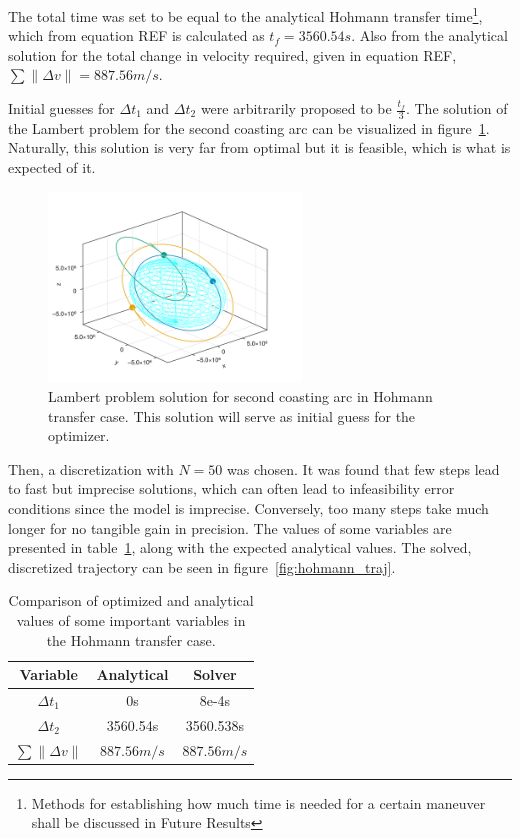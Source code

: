 The total time was set to be equal to the analytical Hohmann transfer time\footnote{Methods for establishing how much time is needed for a certain maneuver shall be discussed in Future Results}, which from equation REF is calculated as \(t_f = 3560.54s\). Also from the analytical solution for the total change in velocity required, given in equation REF, \(\sum \lVert \Delta v \rVert = 887.56m/s\).

Initial guesses for \(\Delta t_1\) and \(\Delta t_2\) were arbitrarily proposed to be \(\frac{t_f}{3}\). The solution of the Lambert problem for the second coasting arc can be visualized in figure~\ref{fig:hohmann_lambert}. Naturally, this solution is very far from optimal but it is feasible, which is what is expected of it.

\begin{figure}[htbp]
    \centering
    \includegraphics[width=0.6\textwidth]{img/hohmann_lambert_guess.png}
    \caption{Lambert problem solution for second coasting arc in Hohmann transfer case. This solution will serve as initial guess for the optimizer.}
    \label{fig:hohmann_lambert}
\end{figure}

Then, a discretization with \(N = 50\) was chosen. It was found that few steps lead to fast but imprecise solutions, which can often lead to infeasibility error conditions since the model is imprecise. Conversely, too many steps take much longer for no tangible gain in precision. The values of some variables are presented in table~\ref{tab:hohmann_results}, along with the expected analytical values. The solved, discretized trajectory can be seen in figure~\ref{fig:hohmann_traj}.

\begin{table}[htbp]
    \centering
    \begin{tabular}{ccc} \toprule
        Variable & Analytical & Solver \\ \midrule
        \(\Delta t_1\) & 0s & 8e-4s \\
        \(\Delta t_2\) & 3560.54s & 3560.538s \\
        \(\sum \lVert \Delta v \rVert\) & \(887.56m/s\) & \(887.56m/s\) \\ \bottomrule
    \end{tabular}
    \caption{Comparison of optimized and analytical values of some important variables in the Hohmann transfer case.}
    \label{tab:hohmann_results}
\end{table}

